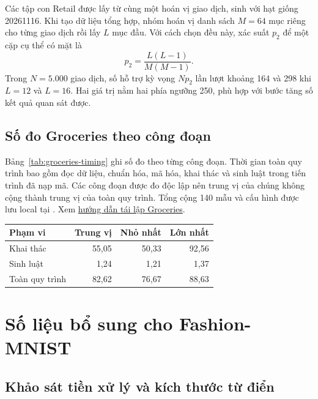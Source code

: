 \documentclass[conference,a4paper]{IEEEtran}
\makeatletter
\newenvironment{reporttable}{\par\medskip\noindent\begin{minipage}{\columnwidth}\def\@captype{table}\centering}{\end{minipage}\par\medskip}
\makeatother
\begin{document}
Các tập con Retail được lấy từ cùng một hoán vị giao dịch, sinh
với hạt giống 20261116. Khi tạo dữ liệu tổng hợp, nhóm hoán vị danh
sách $M=64$ mục riêng cho từng giao dịch rồi lấy $L$ mục đầu.
Với cách chọn đều này, xác suất $p_2$ để một cặp cụ thể có mặt là
\begin{equation}
 p_2=\frac{L(L-1)}{M(M-1)}.
\end{equation}
Trong $N=5.000$ giao dịch, số hỗ trợ kỳ vọng $Np_2$ lần lượt
khoảng 164 và 298 khi $L=12$ và $L=16$. Hai giá trị nằm hai
phía ngưỡng 250, phù hợp với bước tăng số kết quả quan sát được.

\subsection{Số đo Groceries theo công đoạn}
Bảng~\ref{tab:groceries-timing} ghi số đo theo từng công đoạn.
Thời gian toàn quy trình bao gồm đọc dữ liệu, chuẩn hóa, mã hóa,
khai thác và sinh luật trong tiến trình đã nạp mã. Các công đoạn
được đo độc lập nên trung vị của chúng không cộng thành trung vị
của toàn quy trình. Tổng cộng 140 mẫu và cấu hình được lưu local tại
.
Xem \href{https://github.com/NguyenVoTanDuy2006/DataMining-FIM-Project/blob/master/docs/report_groceries.md}{hướng dẫn tái lập Groceries}.

\begin{reporttable}
\caption{Số đo Groceries ở ngưỡng hỗ trợ 1\% và độ tin cậy 50\%. Đơn vị ms, năm lượt sau làm nóng.}
\label{tab:groceries-timing}
\centering\footnotesize
\begin{tabular}{lrrr}\toprule
Phạm vi & Trung vị & Nhỏ nhất & Lớn nhất\\\midrule
Khai thác & 55,05 & 50,33 & 92,56\\
Sinh luật & 1,24 & 1,21 & 1,37\\
Toàn quy trình & 82,62 & 76,67 & 88,63\\\bottomrule
\end{tabular}
\end{reporttable}

\section{Số liệu bổ sung cho Fashion-MNIST}
\label{sec:fashion-reproduction}

\subsection{Khảo sát tiền xử lý và kích thước từ điển}
\end{document}
